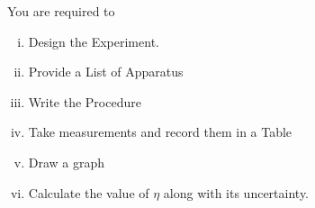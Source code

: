     You are required to

    \begin{enumerate}[(i)]
        \item Design the Experiment.
        \item Provide a List of Apparatus
        \item Write the Procedure
        \item Take measurements and record them in a Table
        \item Draw a graph
        \item Calculate the value of $\eta$ along with its uncertainty.
    \end{enumerate}
